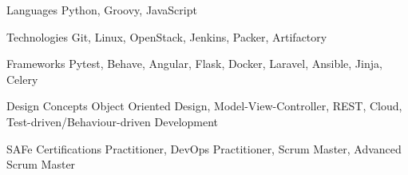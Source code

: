 
\begin{cvskills}
  \cvskill
    {Languages} %
    {Python, Groovy, JavaScript} %

  \cvskill
    {Technologies} %
    {Git, Linux, OpenStack, Jenkins, Packer, Artifactory} %

  \cvskill
    {Frameworks} %
    {
        Pytest,
        Behave,
        Angular,
        Flask,
        Docker,
        Laravel,
        Ansible,
        Jinja,
        Celery
    } %

  \cvskill
    {Design Concepts}
    {
        Object Oriented Design,
        Model-View-Controller,
        REST,
        Cloud,
        Test-driven/Behaviour-driven Development
    }

  \cvskill
    {SAFe Certifications}
    { Practitioner, DevOps Practitioner, Scrum Master, Advanced Scrum Master }

\end{cvskills}
